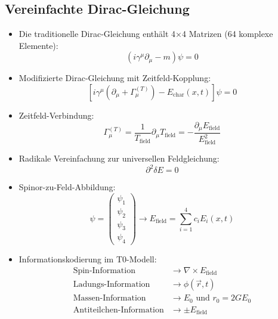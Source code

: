 \documentclass[12pt,a4paper]{article}
\begin{document}
	\subsection{Vereinfachte Dirac-Gleichung}
	\begin{itemize}
		\item Die traditionelle Dirac-Gleichung enth\"{a}lt 4×4 Matrizen (64 komplexe Elemente):
		$$\left(i\gamma^\mu \partial_\mu - m\right) \psi = 0$$
		
		\item Modifizierte Dirac-Gleichung mit Zeitfeld-Kopplung:
		$$\boxed{\left[i\gamma^\mu\left(\partial_\mu + \Gamma_\mu^{(T)}\right) - E_{\text{char}}(x,t)\right]\psi = 0}$$
		
		\item Zeitfeld-Verbindung:
		$$\Gamma_\mu^{(T)} = \frac{1}{T_{\text{field}}} \partial_\mu T_{\text{field}} = -\frac{\partial_\mu E_{\text{field}}}{E_{\text{field}}^2}$$
		
		\item Radikale Vereinfachung zur universellen Feldgleichung:
		$$\boxed{\partial^2 \delta E = 0}$$
		
		\item Spinor-zu-Feld-Abbildung:
		$$\psi = \begin{pmatrix} \psi_1 \\ \psi_2 \\ \psi_3 \\ \psi_4 \end{pmatrix} \rightarrow E_{\text{field}} = \sum_{i=1}^4 c_i E_i(x,t)$$
		
		\item Informationskodierung im T0-Modell:
		\begin{align*}
			\text{Spin-Information} &\rightarrow \nabla \times E_{\text{field}}\\
			\text{Ladungs-Information} &\rightarrow \phi(\vec{r}, t)\\
			\text{Massen-Information} &\rightarrow E_0 \text{ und } r_0 = 2GE_0\\
			\text{Antiteilchen-Information} &\rightarrow \pm E_{\text{field}}
		\end{align*}
	\end{itemize}
	
\end{document}
